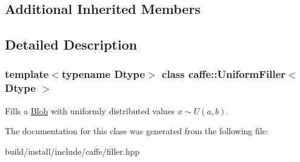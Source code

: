\subsection*{Additional Inherited Members}


\subsection{Detailed Description}
\subsubsection*{template$<$typename Dtype$>$\newline
class caffe\+::\+Uniform\+Filler$<$ Dtype $>$}

Fills a \mbox{\hyperlink{classcaffe_1_1_blob}{Blob}} with uniformly distributed values $ x\sim U(a, b) $. 

The documentation for this class was generated from the following file\+:\begin{DoxyCompactItemize}
\item 
build/install/include/caffe/filler.\+hpp\end{DoxyCompactItemize}
